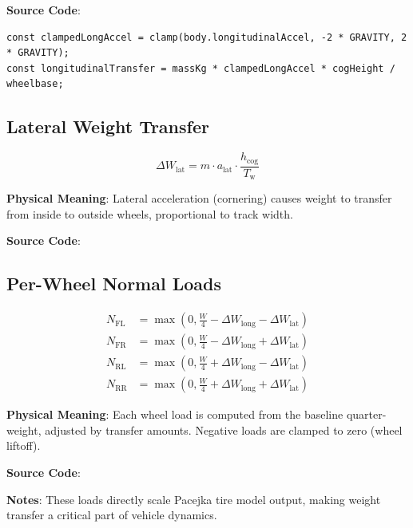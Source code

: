 \textbf{Source Code}: 

\begin{lstlisting}[caption={Longitudinal weight transfer}]
const clampedLongAccel = clamp(body.longitudinalAccel, -2 * GRAVITY, 2 * GRAVITY);
const longitudinalTransfer = massKg * clampedLongAccel * cogHeight / wheelbase;
\end{lstlisting}

\subsection{Lateral Weight Transfer}

\begin{equation}
  \Delta W_{\text{lat}} = m \cdot a_{\text{lat}} \cdot \frac{h_{\text{cog}}}{T_{\text{w}}}
  \label{eq:lateral-transfer}
\end{equation}

\textbf{Physical Meaning}: Lateral acceleration (cornering) causes weight to transfer from inside to outside wheels, proportional to track width.

\textbf{Source Code}: 

\subsection{Per-Wheel Normal Loads}

\begin{align}
  N_{\text{FL}} &= \max\left(0, \frac{W}{4} - \Delta W_{\text{long}} - \Delta W_{\text{lat}}\right) \\
  N_{\text{FR}} &= \max\left(0, \frac{W}{4} - \Delta W_{\text{long}} + \Delta W_{\text{lat}}\right) \\
  N_{\text{RL}} &= \max\left(0, \frac{W}{4} + \Delta W_{\text{long}} - \Delta W_{\text{lat}}\right) \\
  N_{\text{RR}} &= \max\left(0, \frac{W}{4} + \Delta W_{\text{long}} + \Delta W_{\text{lat}}\right)
  \label{eq:wheel-loads}
\end{align}

\textbf{Physical Meaning}: Each wheel load is computed from the baseline quarter-weight, adjusted by transfer amounts. Negative loads are clamped to zero (wheel liftoff).

\textbf{Source Code}: 

\textbf{Notes}: These loads directly scale Pacejka tire model output, making weight transfer a critical part of vehicle dynamics.

\newpage
